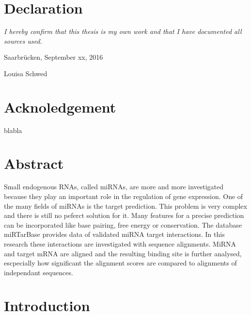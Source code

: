 \documentclass[12pt]{article}
\begin{document}
\section*{Declaration}
\emph{I hereby confirm that this thesis is my own work and that I have documented all sources used.}

\vspace{1cm}

\noindent Saarbr\"ucken, September xx, 2016
\vspace{1.5cm}

\noindent Louisa Schwed
\newpage
\mbox{}

\section*{Acknoledgement}
blabla

\newpage


\tableofcontents

\newpage 
\pagestyle{plain}



\section*{Abstract}

Small endogenous RNAs, called miRNAs, are more and more investigated because they play an important role in the regulation of gene expression. One of the many fields of miRNAs is the target prediction. This problem is very complex and there is still no peferct solution for it. Many features for a precise prediction can be incorporated like base pairing, free energy or conservation. The database miRTarBase provides data of validated miRNA target interactions. In this research these interactions are investigated with sequence alignments. MiRNA and target mRNA are aligned and the resulting binding site is further analysed, escpecially how significant the alignment scores are compared to alignments of independant sequences.
 
 
\vspace{1.5cm}


\section{Introduction}
\end{document}
